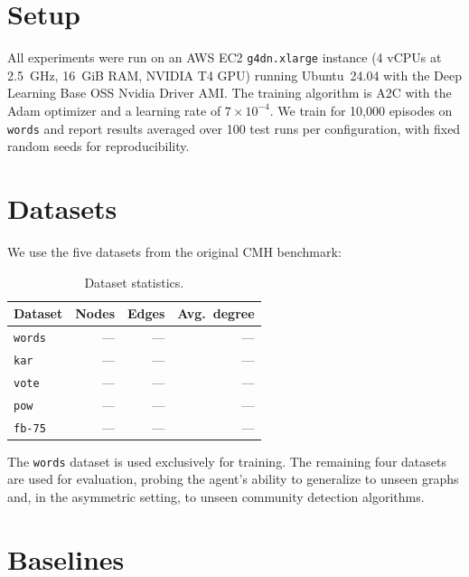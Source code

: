 \documentclass[11pt,a4paper,twoside]{tesis}
\begin{document}
\section{Setup}
\label{sec:setup}

All experiments were run on an AWS EC2 \texttt{g4dn.xlarge} instance (4 vCPUs at
2.5~GHz, 16~GiB RAM, NVIDIA T4 GPU) running Ubuntu~24.04 with the Deep Learning Base
OSS Nvidia Driver AMI. The training algorithm is A2C with the Adam optimizer and a
learning rate of $7 \times 10^{-4}$. We train for 10,000 episodes on \texttt{words}
and report results averaged over 100 test runs per configuration, with fixed random
seeds for reproducibility.

\section{Datasets}
\label{sec:datasets}

We use the five datasets from the original CMH benchmark:

\begin{table}[h]
\centering
\caption{Dataset statistics.}
\label{tab:datasets}
\begin{tabular}{lrrr}
\toprule
Dataset   & Nodes & Edges & Avg.\ degree \\
\midrule
\texttt{words}  & ---   & ---   & ---          \\
\texttt{kar}    & ---   & ---   & ---          \\
\texttt{vote}   & ---   & ---   & ---          \\
\texttt{pow}    & ---   & ---   & ---          \\
\texttt{fb-75}  & ---   & ---   & ---          \\
\bottomrule
\end{tabular}
\end{table}


The \texttt{words} dataset is used exclusively for training. The remaining four
datasets are used for evaluation, probing the agent's ability to generalize to
unseen graphs and, in the asymmetric setting, to unseen community detection algorithms.

\section{Baselines}
\label{sec:baselines}
\end{document}
